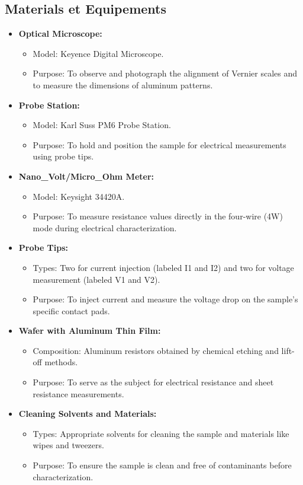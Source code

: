 \subsection{Materials et Equipements}
\begin{itemize}
    \item \textbf{Optical Microscope:}
    \begin{itemize}
        \item Model: Keyence Digital Microscope.
        \item Purpose: To observe and photograph the alignment of Vernier scales and to measure the dimensions of aluminum patterns.
    \end{itemize}

    \item \textbf{Probe Station:}
    \begin{itemize}
        \item Model: Karl Suss PM6 Probe Station.
        \item Purpose: To hold and position the sample for electrical measurements using probe tips.
    \end{itemize}

    \item \textbf{Nano\_Volt/Micro\_Ohm Meter:}
    \begin{itemize}
        \item Model: Keysight 34420A.
        \item Purpose: To measure resistance values directly in the four-wire (4W) mode during electrical characterization.
    \end{itemize}

    \item \textbf{Probe Tips:}
    \begin{itemize}
        \item Types: Two for current injection (labeled I1 and I2) and two for voltage measurement (labeled V1 and V2).
        \item Purpose: To inject current and measure the voltage drop on the sample's specific contact pads.
    \end{itemize}

    \item \textbf{Wafer with Aluminum Thin Film:}
    \begin{itemize}
        \item Composition: Aluminum resistors obtained by chemical etching and lift-off methods.
        \item Purpose: To serve as the subject for electrical resistance and sheet resistance measurements.
    \end{itemize}

    \item \textbf{Cleaning Solvents and Materials:}
    \begin{itemize}
        \item Types: Appropriate solvents for cleaning the sample and materials like wipes and tweezers.
        \item Purpose: To ensure the sample is clean and free of contaminants before characterization.
    \end{itemize}
\end{itemize}


